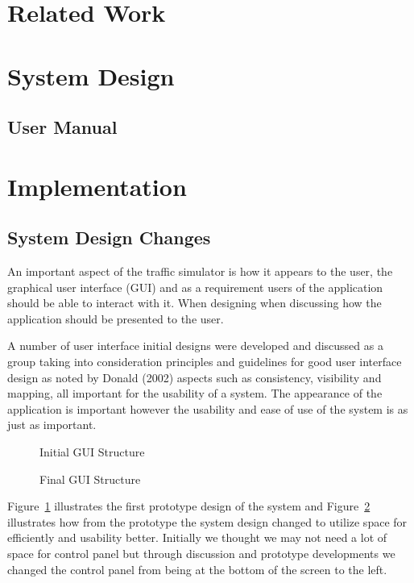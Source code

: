 \documentclass[11pt]{article}
\begin{document}
	\section{Related Work} %
	\section{System Design}
	\subsection{User Manual}
	\section{Implementation} %
	\subsection{System Design Changes}
	An important aspect of the traffic simulator is how it appears to the user, the graphical user interface (GUI) and as a requirement users of the application should be able to interact with it. When designing when discussing how the application should be presented to the user.
	
	A number of user interface initial designs were developed and discussed as a group taking into consideration principles and guidelines for good user interface design as noted by Donald \cite{Norman} (2002) aspects such as consistency, visibility and mapping, all important for the usability of a system. The appearance of the application is important however the usability and ease of use of the system is as just as important.
	\begin{figure}[h]
	\caption{Initial GUI Structure}
	\label{initialGUI}
	\end{figure}
	
	\begin{figure}[h]
	\caption{Final GUI Structure}
	\label{finalGUI}
	\end{figure}
	Figure~\ref{initialGUI} illustrates the first prototype design of the system and Figure~\ref{finalGUI} illustrates how from the prototype the system design changed to utilize space for efficiently and usability better. 
	Initially we thought we may not need a lot of space for control panel but through discussion and prototype developments we changed the control panel from being at the bottom of the screen to the left. 
	
\end{document}
